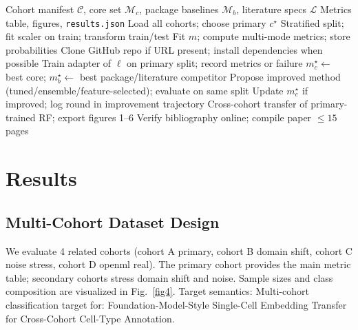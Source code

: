 \documentclass[10pt,journal]{IEEEtran}
\begin{document}
\begin{algorithm}[!t]
\caption{Multi-cohort training with package and literature baselines}
\label{alg:pipeline}
\begin{algorithmic}[1]
\REQUIRE Cohort manifest $\mathcal{C}$, core set $\mathcal{M}_c$, package baselines $\mathcal{M}_b$, literature specs $\mathcal{L}$
\ENSURE Metrics table, figures, \texttt{results.json}
\STATE Load all cohorts; choose primary $c^\star$
\STATE Stratified split; fit scaler on train; transform train/test
\STATE Fit $m$; compute multi-mode metrics; store probabilities
\ENDFOR
\ENDFOR
{}
\STATE Clone GitHub repo if URL present; install dependencies when possible
\STATE Train adapter of $\ell$ on primary split; record metrics or failure
\ENDFOR
\STATE $m^\star_c\leftarrow$ best core; $m^\star_b\leftarrow$ best package/literature competitor
\STATE Propose improved method (tuned/ensemble/feature-selected); evaluate on same split
\STATE Update $m^\star_c$ if improved; log round in improvement trajectory
\ENDWHILE
\STATE Cross-cohort transfer of primary-trained RF; export figures 1--6
\STATE Verify bibliography online; compile paper $\le 15$ pages
\end{algorithmic}
\end{algorithm}

\section{Results}
\label{sec:results}
\subsection{Multi-Cohort Dataset Design}
We evaluate 4 related cohorts (cohort A primary, cohort B domain shift, cohort C noise stress, cohort D openml real). The primary cohort provides the main
metric table; secondary cohorts stress domain shift and noise. Sample sizes and class
composition are visualized in Fig.~\ref{fig4}. Target semantics: Multi-cohort classification target for: Foundation-Model-Style Single-Cell Embedding Transfer for Cross-Cohort Cell-Type Annotation.
\end{document}
